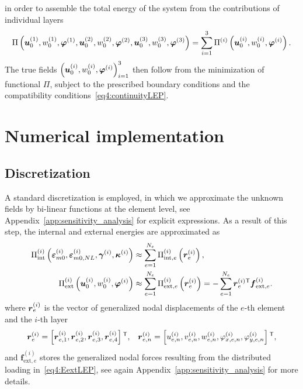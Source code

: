 \documentclass[11pt]{article}
\newcommand{\curv}{\kappa} \newcommand{\curvx}{\kappa_x}
\newcommand{\rot}{\varphi}
\newcommand{\strain}{\varepsilon}
\newcommand{\sstrain}{\gamma}
\newcommand{\mO}{_{m0}}
\newcommand{\mONL}{_{m0,NL}}
\newcommand{\layer}[1]{^{(#1)}}
\newcommand{\lay}[1]{^{(#1)}}
\newcommand{\el}{_e}
\newcommand{\ele}[1]{_{e,#1}}
\newcommand{\elx}[1]{_{x,e,#1}}
\newcommand{\ely}[1]{_{y,e,#1}}
\newcommand{\eln}[1]{_{e,#1}}
\newcommand{\nel}{{N\el}}
\newcommand{\Eint}{\Pi_{\mathrm{int}}}
\newcommand{\Eext}{\Pi_{\mathrm{ext}}}
\newcommand{\Etot}{\Pi}
\newcommand{\M}[1]{{\boldsymbol #1}}
\newcommand{\Mfexte}[2]{\M{f}_{\mathrm{ext},#2}\lay{#1}}
\begin{document}
in order to assemble the total energy of the system from the contributions of individual layers
\begin{equation}
\Etot
\left(
	\mtrx{u}_0\layer{1}, w_0\layer{1}, \mtrx{\rot}\layer{1},
	\mtrx{u}_0\layer{2}, w_0\layer{2}, \mtrx{\rot}\layer{2},
	\mtrx{u}_0\layer{3}, w_0\layer{3}, \mtrx{\rot}\layer{3}
\right)
=
\sum_{i=1}^3
\Etot\layer{i}
\left(
	\mtrx{u}_0\layer{i},
	w_0\layer{i},
	\mtrx{\rot}\layer{i}
\right).
\end{equation}
The true fields $\left( \mtrx{u}_0\layer{i}, w_0\layer{i}, \mtrx{\rot}\layer{i} \right)_{i=1}^{3}$ then follow from the minimization of functional
$\Etot$, subject to the prescribed boundary conditions and the compatibility conditions~\eqref{eq4:continuityLEP}.

\section{Numerical implementation}\label{sec:implementation} 


\subsection{Discretization}\label{sec:discretization}
A standard discretization is employed, in which we approximate the unknown fields by bi-linear functions at the element
level, see Appendix~\ref{app:sensitivity_analysis}  for explicit expressions. 
As a result of this step, the internal and external energies are approximated as 
\begin{align}
\Eint\layer{i}
	\left( 
		\mtrx{\strain}\layer{i}\mO, 
		\mtrx{\strain}\layer{i}\mONL, 
		\mtrx{\sstrain}\layer{i}, 
		\mtrx{\curv}\layer{i} 
	\right)
& \approx 
\sum_{e=1}^\nel
\Pi_{\mathrm{int},e}\layer{i}
\left( 
 \mtrx{r}\layer{i}\el 
\right),
\\
\Eext\layer{i} 
\left(
	\mtrx{u}_0\layer{i},
	w_0\layer{i},
	\mtrx{\rot}\layer{i}
\right)
& \approx 
\sum_{e=1}^\nel
\Pi_{\mathrm{ext},e}\layer{i}
\left( 
 \mtrx{r}\layer{i}\el 
\right)
=
-
\sum_{e=1}^\nel
 \mtrx{r}\layer{i}\el
 \trn 
 \Mfexte{i}{e}.
\end{align}
where $\mtrx{r}\layer{i}\el$ is the vector of generalized nodal displacements of
the $e$-th element and the $i$-th layer\begin{align}\label{eq4:r_el_LEP}
\mtrx{r}\layer{i}\el = \left[ 
\mtrx{r}\layer{i}\eln{1}, 
\mtrx{r}\layer{i}\eln{2}, 
\mtrx{r}\layer{i}\eln{3}, 
\mtrx{r}\layer{i}\eln{4}
\right]\trn,
&&
\mtrx{r}\layer{i}\eln{n} = \left[ 
u\layer{i}\ele{n}, v\layer{i}\ele{n}, w\layer{i}\ele{n}, \rot\layer{i}\elx{n}, \rot\layer{i}\ely{n}
\right]\trn,
\end{align}
and $\Mfexte{i}{e}$ stores the generalized nodal forces resulting from the distributed loading in~\eqref{eq4:EextLEP}, see again Appendix~\ref{app:sensitivity_analysis} for more details.
\end{document}
